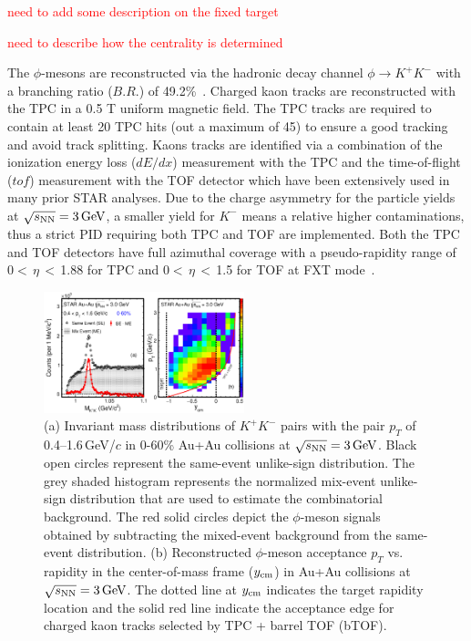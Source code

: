 \documentclass[%
 reprint,	
showpacs,
 amsmath,amssymb,
 aps,
 prc,
]{revtex4-1}
\begin{document}
\textcolor{red}{need to add some description on the fixed target}

\textcolor{red}{need to describe how the centrality is determined}

The $\phi$-mesons are reconstructed via the hadronic decay channel $\phi\rightarrow K^+K^-$ with a branching ratio ($B.R.$) of 49.2\%~\cite{pdg}. Charged kaon tracks are reconstructed with the TPC in a 0.5 T uniform magnetic field. The TPC tracks are required to contain at least 20 TPC hits (out a maximum of 45) to ensure a good tracking and avoid track splitting. Kaons tracks are identified via a combination of the ionization energy loss ($dE/dx$) measurement with the TPC and the time-of-flight ($tof$) measurement with the TOF detector which have been extensively used in many prior STAR analyses. Due to the charge asymmetry for the particle yields at ${\sqrt{s_{\rm NN}} = \rm{3\,GeV}}$, a smaller yield for $K^-$ means a relative higher contaminations, thus a strict PID requiring both TPC and TOF are implemented. Both the TPC and TOF detectors have full azimuthal coverage with a pseudo-rapidity range of 0$<$\,$\eta$\,$<$\,1.88 for TPC and 0$<$\,$\eta$\,$<$\,1.5 for TOF at FXT mode~\cite{TPC,TOF}.



\begin{figure}
\centering
\includegraphics[width=0.52\textwidth]{fig/fig1_signal.eps}
  \caption{(a) Invariant mass distributions of $K^+K^-$ pairs with the pair $p_T$ of 0.4--1.6\,GeV/$c$ in 0-60\% Au+Au collisions at ${\sqrt{s_{\rm NN}} = \rm{3\,GeV}}$. Black open circles represent the same-event unlike-sign distribution. The grey shaded histogram represents the normalized mix-event unlike-sign distribution that are used to estimate the combinatorial background. The red solid circles depict the $\phi$-meson signals obtained by subtracting the mixed-event background from the same-event distribution. (b) Reconstructed $\phi$-meson acceptance $p_T$ vs. rapidity in the center-of-mass frame ($y_{\rm cm}$) in Au+Au collisions at ${\sqrt{s_{\rm NN}} = \rm{3\,GeV}}$. The dotted line at $y_{\rm cm}$ indicates the target rapidity location and the solid red line indicate the acceptance edge for charged kaon tracks selected by TPC + barrel TOF (bTOF).}
\label{fig:phiSignal} 
\end{figure}
\end{document}
